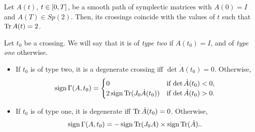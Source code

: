 \begin{prop}
Let $A(t)$, $t \in \interval0T$, be a smooth path of symplectic matrices with $A(0) = I$ and $A(T) \in Sp(2)$. Then, its crossings coincide with the values of $t$ such that $\operatorname{Tr} A(t) = 2$.

Let $t_0$ be a crossing. We will say that it is of \emph{type two} if $A(t_0) = I$, and of \emph{type one} otherwise.
\begin{itemize}
\item If $t_0$ is of type two, it is a degenerate crossing iff $\det \dot A(t_0) = 0$. Otherwise,
\begin{equation}
\operatorname{sign} \Gamma(A,t_0) = \begin{cases}
0 &\text{if $\det \dot A(t_0) < 0$,}\\
2 \operatorname{sign} \operatorname{Tr}(J_0 \dot A(t_0)) &\text{if $\det \dot A(t_0) > 0$.}
\end{cases}
\end{equation}

\item If $t_0$ is of type one, it is degenerate iff $\operatorname{Tr} \dot A(t_0) = 0$. Otherwise,
\begin{equation}
\operatorname{sign} \Gamma(A,t_0) = - \operatorname{sign} \operatorname{Tr}(J_0 A) \times \operatorname{sign} \operatorname{Tr}(\dot A)..
\end{equation}
\end{itemize}
\end{prop}

